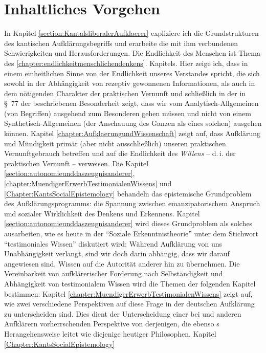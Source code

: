 \section{Inhaltliches Vorgehen}
In Kapitel \ref{section:KantalsliberalerAufklaerer} expliziere ich die
Grundstrukturen des kantischen Aufklärungsbegriffs und erarbeite die
mit ihm verbundenen Schwierigkeiten und Herausforderungen. Die
Endlichkeit des Menschen ist Thema des \ref{chapter:endlichkeitmenschlichendenkens}.
Kapitels. Hier zeige ich, dass  in einem einheitlichen Sinne
von der Endlichkeit unseres Verstandes spricht, die sich sowohl in der
Abhängigkeit von rezeptiv gewonnenen Informationen, als auch in dem nötigenden
Charakter der praktischen Vernunft und schließlich in der in \S~77 der
 beschriebenen Besonderheit zeigt, dass
wir vom Analytisch-Allgemeinen (von Begriffen) ausgehend   zum
Besonderen gehen müssen und nicht von einem
Synthetisch-Allgemeinen (der Anschauung des Ganzen als eines solchen)
ausgehen können. Kapitel \ref{chapter:AufklaerungundWissenschaft}
zeigt auf, dass Aufklärung und Mündigkeit primär (aber nicht
ausschließlich) unseren praktischen 
Vernunftgebrauch betreffen und auf die Endlichkeit des \emph{Willens} -- d.\,i. der
praktischen Vernunft -- verweisen. Die Kapitel
\ref{section:autonomieunddaszeugnisanderer},
\ref{chapter:MuendigerErwerbTestimonialenWissens} und
\ref{Chapter:KantsSocialEpistemology} behandeln das epistemische
Grundproblem des Aufklärungsprogramms: die Spannung zwischen
emanzipatorischem Anspruch und sozialer Wirklichkeit des Denkens und
Erkennens. Kapitel \ref{section:autonomieunddaszeugnisanderer} wird dieses
Grundproblem als solches ausarbeiten, wie es heute in der
\enquote{Soziale Erkenntnistheorie} unter dem Stichwort \enquote{testimoniales Wissen} diskutiert
wird: Während Aufklärung von uns Unabhängigkeit verlangt, sind wir
doch darin  abhängig, dass wir darauf angewiesen sind, Wissen auf
die Autorität anderer hin zu übernehmen. Die Vereinbarkeit von
aufklärerischer Forderung nach Selbständigkeit und Abhängigkeit von
testimonialem Wissen wird die Themen der folgenden Kapitel bestimmen: Kapitel
\ref{chapter:MuendigerErwerbTestimonialenWissens} zeigt auf, wie zwei
verschiedene Perspektiven auf diese Frage in der deutschen Aufklärung zu
unterscheiden sind. Dies dient der Unterscheidung einer bei
 und anderen Aufklärern vorherrschenden Perspektive von
derjenigen, die ebenso s Herangehensweise leitet wie
diejenige heutiger Philosophen. Kapitel \ref{Chapter:KantsSocialEpistemology}
